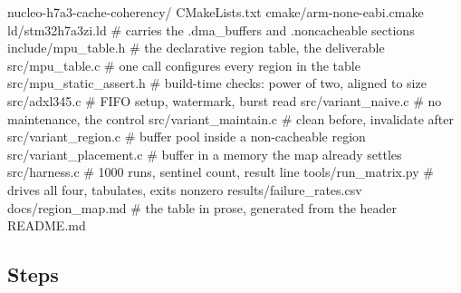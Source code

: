 \begin{plaincode}
nucleo-h7a3-cache-coherency/
  CMakeLists.txt
  cmake/arm-none-eabi.cmake
  ld/stm32h7a3zi.ld              # carries the .dma_buffers and .noncacheable sections
  include/mpu_table.h            # the declarative region table, the deliverable
  src/mpu_table.c                # one call configures every region in the table
  src/mpu_static_assert.h        # build-time checks: power of two, aligned to size
  src/adxl345.c                  # FIFO setup, watermark, burst read
  src/variant_naive.c            # no maintenance, the control
  src/variant_maintain.c         # clean before, invalidate after
  src/variant_region.c           # buffer pool inside a non-cacheable region
  src/variant_placement.c        # buffer in a memory the map already settles
  src/harness.c                  # 1000 runs, sentinel count, result line
  tools/run_matrix.py            # drives all four, tabulates, exits nonzero
  results/failure_rates.csv
  docs/region_map.md             # the table in prose, generated from the header
  README.md
\end{plaincode}

\subsection*{Steps}


